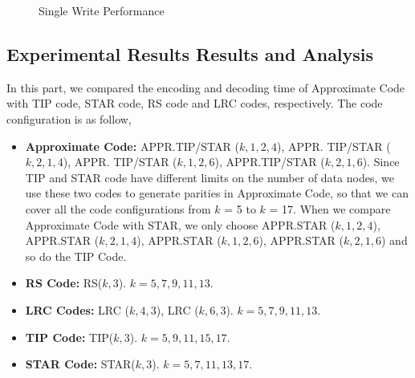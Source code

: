 \documentclass[sigconf]{acmart}
\begin{document}
\begin{figure}[ht]
\caption{Single Write Performance}\label{fig-Sig-Write}
\end{figure}

\subsection{Experimental Results Results and Analysis}
In this part, we compared the encoding and decoding time of Approximate Code with TIP code, STAR code, RS code and LRC codes, respectively. The code configuration is as follow,
\begin{itemize}
    \item \textbf{Approximate Code:} APPR.TIP/STAR ($k,1,2,4$), APPR. TIP/STAR ($k,2,1,4$), APPR. TIP/STAR ($k,1,2,6$), APPR.TIP/STAR ($k,2,1,6$). Since TIP and STAR code have different limits on the number of data nodes, we use these two codes to generate parities in Approximate Code, so that we can cover all the code configurations from $k$ = 5 to $k$ = 17. When we compare Approximate Code with STAR, we only choose APPR.STAR ($k,1,2,4$), APPR.STAR ($k,2,1,4$), APPR.STAR ($k,1,2,6$), APPR.STAR ($k,2,1,6$) and so do the TIP Code.
    \item \textbf{RS Code:} RS($k,3$). $k = 5,7,9,11,13$.
    \item \textbf{LRC Codes:} LRC ($k,4,3$), LRC ($k,6,3$). $k = 5,7,9,11,13$.
    \item \textbf{TIP Code:} TIP($k,3$). $k = 5,9,11,15,17$.
    \item \textbf{STAR Code:} STAR($k,3$). $k = 5,7,11,13,17$.
\end{itemize}
\end{document}
